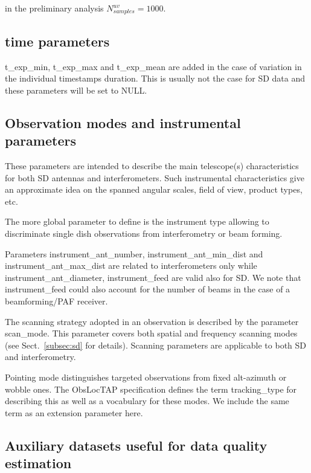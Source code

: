 \documentclass[11pt,a4paper]{ivoa}
\begin{document}
in the preliminary analysis $N^{uv}_{samples} = 1000$.



\subsection{time parameters}
t\_exp\_min, t\_exp\_max and t\_exp\_mean are added in the case of variation in the individual timestamps 
duration. This is usually not the case for SD data and these parameters will be set to NULL.


\subsection{Observation modes and instrumental parameters}
These parameters are intended to describe the main telescope(s) characteristics for both SD antennas and interferometers. Such instrumental characteristics give an approximate idea on the spanned angular scales, field of view, product types, etc.

The more global parameter to define is the instrument type allowing to discriminate single dish observations from interferometry or beam forming. 

Parameters instrument\_ant\_number, instrument\_ant\_min\_dist and instrument\_ant\_max\_dist are related to interferometers only while instrument\_ant\_diameter, instrument\_feed are valid also for SD.
We note that instrument\_feed could also  account for the number of beams in the case of a beamforming/PAF receiver.

The scanning strategy adopted in an observation is described by the parameter scan\_mode. This parameter covers both spatial and frequency scanning modes (see Sect.~\ref{subsec:sd} for details). 
Scanning parameters are applicable to both SD and interferometry.

Pointing mode distinguishes targeted observations from  fixed alt-azimuth or wobble ones. The ObsLocTAP specification \citep{2021ivoa.spec.0724S} defines the term tracking\_type for describing this as well as a  vocabulary for these modes. We include the same term as an extension parameter here.


\subsection{Auxiliary datasets useful for data quality estimation}
\end{document}
